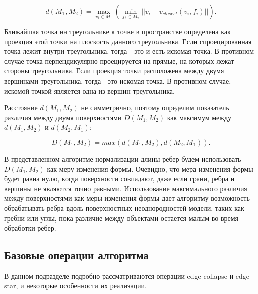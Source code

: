 \documentclass[14pt]{article}
\numberwithin{figure}{section}
\numberwithin{equation}{section}
\begin{document}
\begin{equation}
	d(M_1, M_2) = \max_{v_i \in M_1}(\min_{f_i \in M_2}||v_i - v_{closest}(v_i, f_i)||).
\end{equation}


Ближайшая точка на треугольнике к точке в пространстве определена как проекция этой точки на плоскость данного треугольника. Если спроецированная точка лежит внутри треугольника, тогда - это и есть искомая точка. В противном случае точка перпендикулярно проецируется на прямые, на которых лежат стороны треугольника. Если проекция точки расположена между двумя вершинами треугольника, тогда - это искомая точка. В противном случае, искомой точкой является одна из вершин треугольника.


Расстояние $d(M_1, M_2)$ не симметрично, поэтому определим показатель различия между двумя поверхностями $D(M_1, M_2)$ как максимум между $d(M_1, M_2)$ и $d(M_2, M_1)$:

\begin{equation}
	D(M_1, M_2) = max(d(M_1, M_2), d(M_2, M_1)).
\end{equation}

В представленном алгоритме нормализации длины ребер будем использовать $D(M_1, M_2)$ как меру изменения формы. Очевидно, что мера изменения формы будет равна нулю, когда поверхности совпадают, даже если грани, ребра и вершины не являются точно равными. Использование максимального различия между поверхностями как меры изменения формы дает алгоритму возможность обрабатывать ребра вдоль поверхностных неоднородностей модели, таких как гребни или углы, пока различие между объектами остается малым во время обработки ребер.


\subsection{Базовые операции алгоритма}

В данном подразделе подробно рассматриваются операции edge-collapse и edge-star, и некоторые особенности их реализации.
\end{document}

